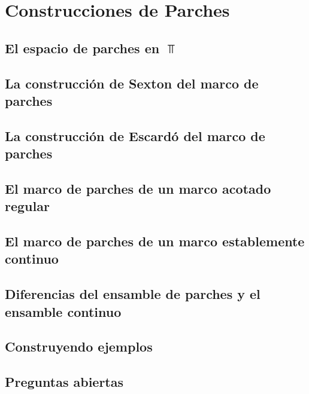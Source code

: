 \chapter{Construcciones de Parches}

\section{El espacio de parches en $\Top$}
\section{La construcción de Sexton del marco de parches}
\section{La construcción de Escardó del marco de parches}
\section{El marco de parches de un marco acotado regular}
\section{El marco de parches de un marco establemente continuo}
\section{Diferencias del ensamble de parches y el ensamble continuo}
\section{Construyendo ejemplos}
\section{Preguntas abiertas}